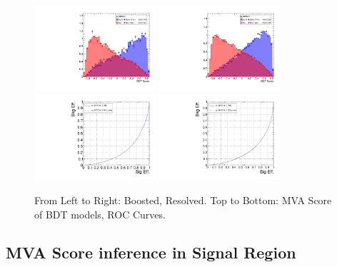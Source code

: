\begin{figure}[!ht]
  \centering
  \includegraphics[width=0.4\textwidth]{analysis_plots/tmva_plots/zv_BDTG14.pdf}
  \includegraphics[width=0.4\textwidth]{analysis_plots/tmva_plots/zjj_BDTG14.pdf} \\
  \includegraphics[width=0.4\textwidth]{analysis_plots/tmva_plots/zv_BDTG14_roc.pdf}
  \includegraphics[width=0.4\textwidth]{analysis_plots/tmva_plots/zjj_BDTG14_roc.pdf}
  \caption[MVA Score ROC Curve]%
  {From Left to Right: Boosted, Resolved. Top to Bottom: MVA Score of BDT models,
    ROC Curves.}%
  \label{fig:vbs-training-score}
\end{figure}

\clearpage
\subsection{
  MVA Score inference in Signal Region
}

